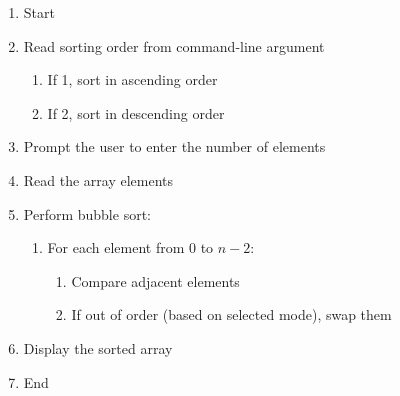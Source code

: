 \begin{enumerate}
    \item Start
    \item Read sorting order from command-line argument
    \begin{enumerate}
        \item If 1, sort in ascending order
        \item If 2, sort in descending order
    \end{enumerate}
    \item Prompt the user to enter the number of elements
    \item Read the array elements
    \item Perform bubble sort:
    \begin{enumerate}
        \item For each element from $0$ to $n - 2$:
        \begin{enumerate}
            \item Compare adjacent elements
            \item If out of order (based on selected mode), swap them
        \end{enumerate}
    \end{enumerate}
    \item Display the sorted array
    \item End
\end{enumerate}

